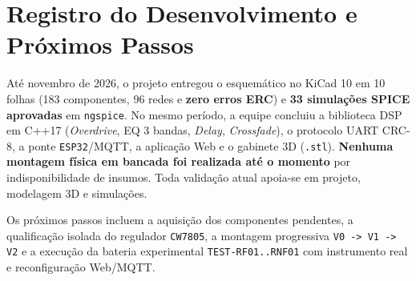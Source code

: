 \documentclass[12pt,openright,oneside,a4paper,brazil]{abntex2}
\begin{document}
\section{Registro do Desenvolvimento e Próximos Passos}
Até novembro de 2026, o projeto entregou o esquemático no KiCad 10 em 10 folhas (183 componentes, 96 redes e \textbf{zero erros ERC}) e \textbf{33 simulações SPICE aprovadas} em \texttt{ngspice}. No mesmo período, a equipe concluiu a biblioteca DSP em C++17 (\textit{Overdrive}, EQ 3 bandas, \textit{Delay}, \textit{Crossfade}), o protocolo UART CRC-8, a ponte \texttt{ESP32}/MQTT, a aplicação Web e o gabinete 3D (\texttt{.stl}). \textbf{Nenhuma montagem física em bancada foi realizada até o momento} por indisponibilidade de insumos. Toda validação atual apoia-se em projeto, modelagem 3D e simulações.

Os próximos passos incluem a aquisição dos componentes pendentes, a qualificação isolada do regulador \texttt{CW7805}, a montagem progressiva \texttt{V0 -> V1 -> V2} e a execução da bateria experimental \texttt{TEST-RF01..RNF01} com instrumento real e reconfiguração Web/MQTT.
\end{document}
